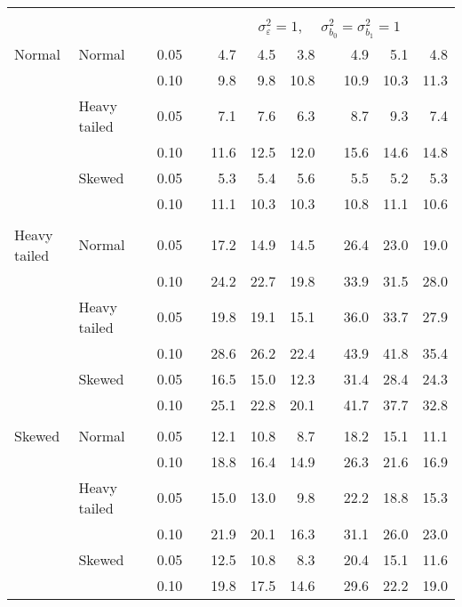 \begin{table}[ht]
\begin{scriptsize}
\begin{tabular}{ll p{.1cm} c p{.1cm} rrr p{.1cm} rrr}
&&&&&&&&&&&\\
& && && \multicolumn{7}{c}{$\sigma_{\varepsilon}^2 = 1$, \ \ $\sigma_{b_0}^2 = \sigma_{b_1}^2 = 1$} \\ \cline{6-12}
\rowcolor{gray!20} Normal & Normal &  & 0.05 &  & 4.7 & 4.5 & 3.8 &  & 4.9 & 5.1 & 4.8 \\ 
\rowcolor{gray!20}   &  &  & 0.10 &  & 9.8 & 9.8 & 10.8 &  & 10.9 & 10.3 & 11.3 \\ 
\rowcolor{gray!20}   & Heavy tailed &  & 0.05 &  & 7.1 & 7.6 & 6.3 &  & 8.7 & 9.3 & 7.4 \\ 
\rowcolor{gray!20}   &  &  & 0.10 &  & 11.6 & 12.5 & 12.0 &  & 15.6 & 14.6 & 14.8 \\ 
\rowcolor{gray!20}   & Skewed &  & 0.05 &  & 5.3 & 5.4 & 5.6 &  & 5.5 & 5.2 & 5.3 \\ 
\rowcolor{gray!20}   &  &  & 0.10 &  & 11.1 & 10.3 & 10.3 &  & 10.8 & 11.1 & 10.6 \\ 
&&&&&&&&&&&\\
  Heavy tailed & Normal &  & 0.05 &  & 17.2 & 14.9 & 14.5 &  & 26.4 & 23.0 & 19.0 \\ 
   &  &  & 0.10 &  & 24.2 & 22.7 & 19.8 &  & 33.9 & 31.5 & 28.0 \\ 
   & Heavy tailed &  & 0.05 &  & 19.8 & 19.1 & 15.1 &  & 36.0 & 33.7 & 27.9 \\ 
   &  &  & 0.10 &  & 28.6 & 26.2 & 22.4 &  & 43.9 & 41.8 & 35.4 \\ 
   & Skewed &  & 0.05 &  & 16.5 & 15.0 & 12.3 &  & 31.4 & 28.4 & 24.3 \\ 
   &  &  & 0.10 &  & 25.1 & 22.8 & 20.1 &  & 41.7 & 37.7 & 32.8 \\ 
&&&&&&&&&&&\\
  Skewed & Normal &  & 0.05 &  & 12.1 & 10.8 & 8.7 &  & 18.2 & 15.1 & 11.1 \\ 
   &  &  & 0.10 &  & 18.8 & 16.4 & 14.9 &  & 26.3 & 21.6 & 16.9 \\ 
   & Heavy tailed &  & 0.05 &  & 15.0 & 13.0 & 9.8 &  & 22.2 & 18.8 & 15.3 \\ 
   &  &  & 0.10 &  & 21.9 & 20.1 & 16.3 &  & 31.1 & 26.0 & 23.0 \\ 
   & Skewed &  & 0.05 &  & 12.5 & 10.8 & 8.3 &  & 20.4 & 15.1 & 11.6 \\ 
   &  &  & 0.10 &  & 19.8 & 17.5 & 14.6 &  & 29.6 & 22.2 & 19.0 \\ 


\end{tabular}
\end{scriptsize}
\end{table}
